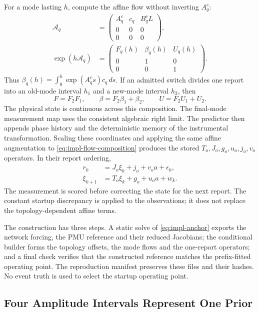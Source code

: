 For a mode lasting $h$, compute the affine flow without inverting
$A_q^c$:
\begin{align}
 \mathcal A_q&=\begin{pmatrix}A_q^c&c_q&B_q^cL\\0&0&0\\0&0&0\end{pmatrix},\nonumber\\
 \exp(h\mathcal A_q)
 &=\begin{pmatrix}F_q(h)&\beta_q(h)&U_q(h)\\0&1&0\\0&0&1\end{pmatrix}.
 \label{eq:impl-affine-flow}
\end{align}
Thus $\beta_q(h)=\int_0^h\exp(A_q^cs)c_q\,ds$.
If an admitted switch divides one report into an old-mode interval
$h_1$ and a new-mode interval $h_2$, then
\begin{equation}
 F=F_2F_1,\qquad \beta=F_2\beta_1+\beta_2,\qquad
 U=F_2U_1+U_2.
 \label{eq:impl-flow-composition}
\end{equation}
The physical state is continuous across this composition. The final-mode
measurement map uses the consistent algebraic right limit. The predictor
then appends phase history and the deterministic memory of the
instrumental transformation. Scaling these coordinates and applying the
same affine augmentation to \eqref{eq:impl-flow-composition} produces the
stored $T_o,J_o,g_o,u_o,j_o,v_o$ operators. In their report ordering,
\begin{align}
 r_k&=J_o\xi_k+j_o+v_oa+\epsilon_k,\nonumber\\
 \xi_{k+1}&=T_o\xi_k+g_o+u_oa+w_k.
 \label{eq:impl-report-order}
\end{align}
The measurement is scored before correcting the state for the next
report. The constant startup discrepancy is applied to the observations;
it does not replace the topology-dependent affine terms.

The construction has three steps. A static solve of
\eqref{eq:impl-anchor} exports the network forcing, the PMU reference and
their reduced Jacobians; the conditional builder forms the topology
offsets, the mode flows and the one-report operators; and a final check
verifies that the constructed reference matches the prefix-fitted
operating point. The reproduction manifest preserves
these files and their hashes. No event truth is used to select the
startup operating point.

\subsection{Four Amplitude Intervals Represent One Prior}
\label{app:severity-partition}

